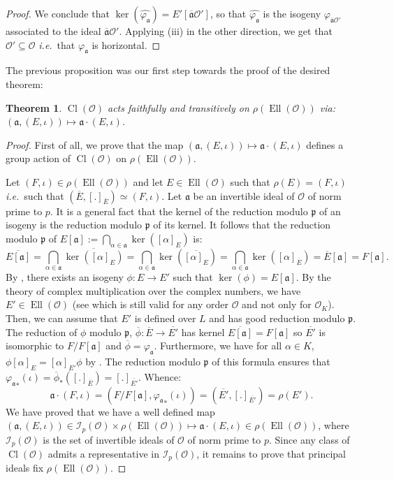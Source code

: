 \documentclass[a4paper,10pt]{report}
\theoremstyle{definition}
\theoremstyle{plain}
\newtheorem{Theorem}[Definition]{Theorem}
\theoremstyle{definition}
\newcommand{\ie}{\emph{i.e.}\ }
\newcommand{\mO}{\mathcal{O}}
\renewcommand{\(}{\left(}
\renewcommand{\)}{\right)}
\newcommand{\mf}[1]{\mathfrak{#1}}
\newcommand{\mfp}{\mathfrak{p}}
\DeclareMathOperator{\Cl}{Cl}
\DeclareMathOperator{\Ell}{Ell}
\begin{document}
\begin{proof}
We conclude that $\ker(\widehat{\varphi_{\mf{a}}})=E'[\overline{\mf{a}}\mO']$, so that $\widehat{\varphi_{\mf{a}}}$ is the isogeny $\varphi_{\overline{\mf{a}}\mO'}$ associated to the ideal $\overline{\mf{a}}\mO'$. Applying (iii) in the other direction, we get that $\mO'\subseteq\mO$ \ie that $\varphi_{\mf{a}}$ is horizontal.
\end{proof}

The previous proposition was our first step towards the proof of the desired theorem:

\begin{Theorem}\label{Theorem 3}
$\Cl(\mO)$ acts faithfully and transitively on $\rho(\Ell(\mO))$ via: $(\mf{a},(E,\iota))\longmapsto \mf{a}\cdot (E,\iota)$.
\end{Theorem}

\begin{proof}
First of all, we prove that the map $(\mf{a},(E,\iota))\longmapsto \mf{a}\cdot (E,\iota)$ defines a group action of $\Cl(\mO)$ on $\rho(\Ell(\mO))$. 

Let $(F,\iota)\in \rho(\Ell(\mO))$ and let $E\in\Ell(\mO)$ such that $\rho(E)=(F,\iota)$ \ie such that $(\overline{E},[.]_{\overline{E}})\simeq (F,\iota)$.  Let $\mf{a}$ be an invertible ideal of $\mO$ of norm prime to $p$. It is a general fact that the kernel of the reduction modulo $\mfp$ of an isogeny is the reduction modulo $\mfp$ of its kernel. It follows that the reduction modulo $\mfp$ of $E[\mf{a}]:=\bigcap_{\alpha\in\mf{a}}\ker([\alpha]_E)$ is:
\[\overline{E[\mf{a}]}=\bigcap_{\alpha\in\mf{a}}\overline{\ker([\alpha]_E)}=\bigcap_{\alpha\in\mf{a}}\ker(\overline{[\alpha]_E})=\bigcap_{\alpha\in\mf{a}}\ker([\alpha]_{\overline{E}})=\overline{E}[\mf{a}]=F[\mf{a}].\]
By \cite[Proposition III.4.12]{Silverman1}, there exists an isogeny $\phi : E\longrightarrow E'$ such that $\ker(\phi)=E[\mf{a}]$. By the theory of complex multiplication over the complex numbers,  we have $E'\in\Ell(\mO)$ (see \cite[Proposition II.2.1.(a).(ii)]{Silverman2} which is still valid for any order $\mO$ and not only for $\mO_K$). Then, we can assume that $E'$ is defined over $L$ and has good reduction modulo $\mfp$. The reduction of $\phi$ modulo $\mfp$, $\overline{\phi}:\overline{E}\longrightarrow\overline{E'}$ has kernel $\overline{E[\mf{a}]}=F[\mf{a}]$ so $\overline{E'}$ is isomorphic to $F/F[\mf{a}]$ and $\overline{\phi}=\varphi_{\mf{a}}$. Furthermore, we have for all $\alpha\in K$, $\phi[\alpha]_E=[\alpha]_{E'}\phi$ by \cite[Corollary II.1.1.1]{Silverman2}. The reduction modulo $\mfp$ of this formula ensures that ${\varphi_{\mf{a}}}_*(\iota)=\overline{\phi}_*([.]_{\overline{E}})=[.]_{\overline{E'}}$. Whence: 
\[\mf{a}\cdot(F,\iota)=(F/F[\mf{a}],{\varphi_{\mf{a}}}_*(\iota))=(\overline{E'},[.]_{\overline{E'}})=\rho(E').\]
We have proved that we have a well defined map $(\mf{a},(E,\iota))\in\mathcal{I}_p(\mO)\times\rho(\Ell(\mO))\longmapsto \mf{a}\cdot (E,\iota)\in\rho(\Ell(\mO))$, where $\mathcal{I}_p(\mO)$ is the set of invertible ideals of $\mO$ of norm prime to $p$. Since any class of $\Cl(\mO)$ admits a representative in $\mathcal{I}_p(\mO)$, it remains to prove that principal ideals fix $\rho(\Ell(\mO))$. 


\end{proof}
\end{document}

